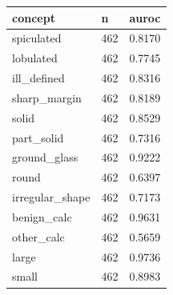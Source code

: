 \begin{tabular}{lll}
\hline
concept & n & auroc \\
\hline
spiculated & 462 & 0.8170 \\
lobulated & 462 & 0.7745 \\
ill\_defined & 462 & 0.8316 \\
sharp\_margin & 462 & 0.8189 \\
solid & 462 & 0.8529 \\
part\_solid & 462 & 0.7316 \\
ground\_glass & 462 & 0.9222 \\
round & 462 & 0.6397 \\
irregular\_shape & 462 & 0.7173 \\
benign\_calc & 462 & 0.9631 \\
other\_calc & 462 & 0.5659 \\
large & 462 & 0.9736 \\
small & 462 & 0.8983 \\
\hline
\end{tabular}
